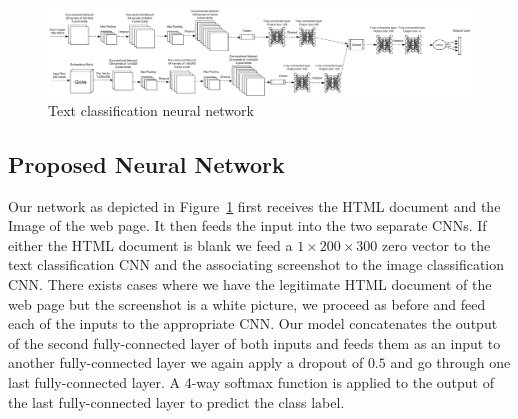 \documentclass{article} %
\begin{document}
\begin{figure}
\centering
        \includegraphics[totalheight=3cm]{Combined}
    \caption{Text classification neural network}
    \label{fig:CNN}
\end{figure}

\subsection{Proposed Neural Network}
  \label{ProposedNet}

Our network as depicted in Figure~\ref{fig:CNN} first receives the HTML document and the Image of the web page. It then feeds the input into the two separate CNNs. If either the HTML document is blank we feed a $1\times200\times300$ zero vector to the text classification CNN and the associating screenshot to the image classification CNN. There exists cases where we have the legitimate HTML document of the web page but the screenshot is a white picture, we proceed as before and feed each of the inputs to the appropriate CNN. Our model concatenates the output of the second fully-connected layer of both inputs and feeds
them as an input to another fully-connected layer we again apply a dropout of $0.5$ and go through one last fully-connected layer. A 4-way softmax function is applied to the output of the last fully-connected layer to predict the class label.
\end{document}
